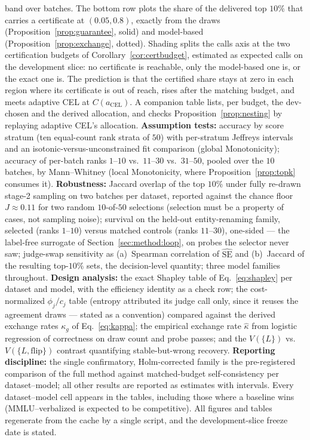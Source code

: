 \documentclass[11pt]{article}
\newcommand{\SE}{\mathrm{SE}}
\begin{document}
band over batches. The bottom row plots the share of the delivered
top $10\%$ that carries a certificate at $(0.05, 0.8)$, exactly from the
draws (Proposition~\ref{prop:guarantee}, solid) and model-based
(Proposition~\ref{prop:exchange}, dotted). Shading splits the calls
axis at the two certification budgets of
Corollary~\ref{cor:certbudget}, estimated as expected calls on the
development slice: no certificate is reachable, only the model-based
one is, or the exact one is. The prediction is that the certified
share stays at zero in each region where its certificate is out of
reach, rises after the matching budget, and meets adaptive CEL at
$C(a_{\mathrm{CEL}})$. A companion table lists, per budget, the
dev-chosen and the derived allocation, and checks
Proposition~\ref{prop:nesting} by replaying adaptive CEL's allocation.
\textbf{Assumption tests:} accuracy by score stratum (ten equal-count
rank strata of $50$) with per-stratum Jeffreys intervals and an
isotonic-versus-unconstrained fit comparison (global Monotonicity);
accuracy of per-batch ranks $1$--$10$ vs.\ $11$--$30$ vs.\ $31$--$50$,
pooled over the $10$ batches, by Mann--Whitney (local Monotonicity,
where Proposition~\ref{prop:topk} consumes it).
\textbf{Robustness:} Jaccard overlap of the top $10\%$ under fully
re-drawn stage-2 sampling on two batches per dataset, reported against
the chance floor $J \approx 0.11$ for two random $10$-of-$50$
selections (selection must be a property of cases, not sampling
noise); survival on the held-out entity-renaming family, selected
(ranks $1$--$10$) versus matched controls (ranks $11$--$30$),
one-sided --- the label-free surrogate of
Section~\ref{sec:method:loop}, on probes the selector never saw;
judge-swap sensitivity as (a)~Spearman correlation of
$\widehat{\SE}$ and (b)~Jaccard of the resulting top-$10\%$ sets, the
decision-level quantity; three model families throughout.
\textbf{Design analysis:} the exact Shapley table of
Eq.~\eqref{eq:shapley} per dataset and model, with the efficiency
identity as a check row; the cost-normalized $\phi_j / c_j$ table
(entropy attributed its judge call only, since it reuses the
agreement draws --- stated as a convention) compared against the
derived exchange rates $\kappa_g$ of Eq.~\eqref{eq:kappa}; the
empirical exchange rate $\hat\kappa$ from logistic regression of
correctness on draw count and probe passes; and the $V(\{L\})$ vs.\
$V(\{L,\mathrm{flip}\})$ contrast quantifying stable-but-wrong
recovery.
\textbf{Reporting discipline:} the single confirmatory,
Holm-corrected family is the pre-registered comparison of the full
method against matched-budget self-consistency per dataset--model;
all other results are reported as estimates with intervals. Every
dataset--model cell appears in the tables, including those where a
baseline wins (MMLU--verbalized is expected to be competitive). All
figures and tables regenerate from the cache by a single script, and
the development-slice freeze date is stated.
\end{document}
